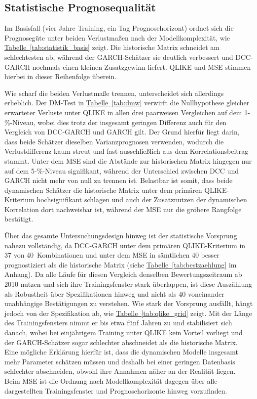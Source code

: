 \documentclass[a4paper, 12pt]{article}
\begin{document}
\subsection{Statistische Prognosequalität}\label{sec:statistisch}
Im Basisfall (vier Jahre Training, ein Tag Prognosehorizont) ordnet sich die Prognosegüte unter beiden Verlustmaßen nach der Modellkomplexität, wie \hyperref[tab:statistik_basis]{Tabelle~\ref*{tab:statistik_basis}} zeigt.
Die historische Matrix schneidet am schlechtesten ab, während der GARCH-Schätzer sie deutlich verbessert und DCC-GARCH nochmals einen kleinen Zusatzgewinn liefert.
QLIKE und MSE stimmen hierbei in dieser Reihenfolge überein.



Wie scharf die beiden Verlustmaße trennen, unterscheidet sich allerdings erheblich.
Der DM-Test in \hyperref[tab:dmw]{Tabelle~\ref*{tab:dmw}} verwirft die Nullhypothese gleicher erwarteter Verluste unter QLIKE in allen drei paarweisen Vergleichen auf dem 1-\%-Niveau, wobei dies trotz der insgesamt geringen Differenz auch für den Vergleich von DCC-GARCH und GARCH gilt.
Der Grund hierfür liegt darin, dass beide Schätzer dieselben Varianzprognosen verwenden, wodurch die Verlustdifferenz kaum streut und fast ausschließlich aus dem Korrelationsbeitrag stammt.
Unter dem MSE sind die Abstände zur historischen Matrix hingegen nur auf dem 5-\%-Niveau signifikant, während der Unterschied zwischen DCC und GARCH nicht mehr von null zu trennen ist.
Belastbar ist somit, dass beide dynamischen Schätzer die historische Matrix unter dem primären QLIKE-Kriterium hochsignifikant schlagen und auch der Zusatznutzen der dynamischen Korrelation dort nachweisbar ist, während der MSE nur die gröbere Rangfolge bestätigt.



Über das gesamte Untersuchungsdesign hinweg ist der statistische Vorsprung nahezu vollständig, da DCC-GARCH unter dem primären QLIKE-Kriterium in 37 von 40~Kombinationen und unter dem MSE in sämtlichen 40 besser prognostiziert als die historische Matrix (siehe \hyperref[tab:bestzaehlung]{Tabelle~\ref*{tab:bestzaehlung}} im Anhang).
Da alle Läufe für diesen Vergleich denselben Bewertungszeitraum ab 2010 nutzen und sich ihre Trainingsfenster stark überlappen, ist diese Auszählung als Robustheit über Spezifikationen hinweg und nicht als 40 voneinander unabhängige Bestätigungen zu verstehen.
Wie stark der Vorsprung ausfällt, hängt jedoch von der Spezifikation ab, wie \hyperref[tab:qlike_grid]{Tabelle~\ref*{tab:qlike_grid}} zeigt.
Mit der Länge des Trainingsfensters nimmt er bis etwa fünf Jahren zu und stabilisiert sich danach, wobei bei einjährigem Training unter QLIKE kein Vorteil vorliegt und der GARCH-Schätzer sogar schlechter abschneidet als die historische Matrix.
Eine mögliche Erklärung hierfür ist, dass die dynamischen Modelle insgesamt mehr Parameter schätzen müssen und deshalb bei einer geringen Datenbasis schlechter abschneiden, obwohl ihre Annahmen näher an der Realität liegen.
Beim MSE ist die Ordnung nach Modellkomplexität dagegen über alle dargestellten Trainingsfenster und Prognosehorizonte hinweg vorzufinden.
\end{document}
